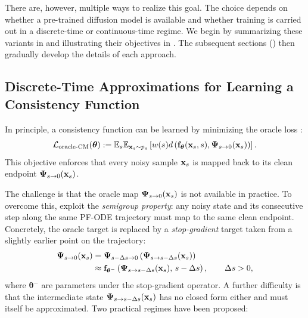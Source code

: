 There are, however, multiple ways to realize this goal. 
The choice depends on whether a pre-trained diffusion model is available and whether training is carried out in a discrete-time or continuous-time regime. 
We begin by summarizing these variants in  and illustrating their objectives in . 
The subsequent sections () then gradually develop the details of each approach.

\begin{table}[th]
  \caption{Training Objectives of Consistency Models}
  \small
  \centering
  \label{tb:consistency-methods}
\end{table} 




\subsection{Discrete-Time Approximations for Learning a Consistency Function}\label{subsec:approx-cm}

In principle, a consistency function can be learned by minimizing the oracle loss :
\[
    \mathcal{L}_{\mathrm{oracle}\text{-}\mathrm{CM}}({\bm{\theta}}) 
    := \mathbb{E}_{s} \mathbb{E}_{{\mathbf{x}}_s\sim p_s} \left[ w(s)  d \left({\mathbf{f}}_{\bm{\theta}}({\mathbf{x}}_s,s), {\bm{\Psi}}_{s\to 0}({\mathbf{x}}_s)\right)\right].
\]
This objective enforces that every noisy sample ${\mathbf{x}}_s$ is mapped back to its clean endpoint ${\bm{\Psi}}_{s\to 0}({\mathbf{x}}_s)$.  

The challenge is that the oracle map ${\bm{\Psi}}_{s\to 0}({\mathbf{x}}_s)$ is not available in practice.  
To overcome this, \citet{song2023consistency} exploit the \emph{semigroup property}: any noisy state and its consecutive step along the same PF-ODE trajectory must map to the same clean endpoint.  
Concretely, the oracle target is replaced by a \emph{stop-gradient} target taken from a slightly earlier point on the trajectory:
\begin{align*}
    {\bm{\Psi}}_{s\to 0}({\mathbf{x}}_s) 
    &= {\bm{\Psi}}_{s-\Delta s \to 0} \left({\bm{\Psi}}_{s\to s-\Delta s}({\mathbf{x}}_s)\right) \\
    &\approx {\mathbf{f}}_{{\bm{\theta}}^-} \left({\bm{\Psi}}_{s\to s-\Delta s}({\mathbf{x}}_s),\,s-\Delta s\right), 
    \qquad \Delta s > 0,
\end{align*}
where $\bm{\theta}^-$ are parameters under the stop-gradient operator. 
A further difficulty is that the intermediate state ${\bm{\Psi}}_{s\to s-\Delta s}({\mathbf{x}}_s)$ has no closed form either and must itself be approximated.  
Two practical regimes have been proposed:

